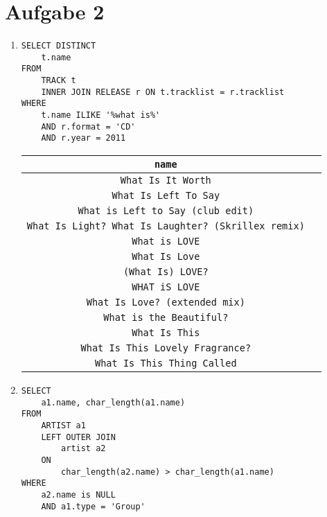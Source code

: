 \documentclass{article}
\begin{document}
    \section*{Aufgabe 2}
    \begin{enumerate}
        \item
            \begin{verbatim}
SELECT DISTINCT
    t.name
FROM
    TRACK t
    INNER JOIN RELEASE r ON t.tracklist = r.tracklist
WHERE
    t.name ILIKE '%what is%'
    AND r.format = 'CD'
    AND r.year = 2011
            \end{verbatim}
            \begin{tabular}{|c|c|}
                \texttt{name} \\
                \toprule
                \texttt{What Is It Worth} \\
                \texttt{What Is Left To Say} \\
                \texttt{What is Left to Say (club edit)} \\
                \texttt{What Is Light? What Is Laughter? (Skrillex remix)} \\
                \texttt{What is LOVE} \\
                \texttt{What Is Love} \\
                \texttt{(What Is) LOVE?} \\
                \texttt{WHAT iS LOVE} \\
                \texttt{What Is Love? (extended mix)} \\
                \texttt{What is the Beautiful?} \\
                \texttt{What Is This} \\
                \texttt{What Is This Lovely Fragrance?} \\
                \texttt{What Is This Thing Called} \\
            \end{tabular}
        \item
            \begin{verbatim}
SELECT
    a1.name, char_length(a1.name)
FROM
    ARTIST a1
    LEFT OUTER JOIN
        artist a2
    ON
        char_length(a2.name) > char_length(a1.name)
WHERE
    a2.name is NULL
    AND a1.type = 'Group'
            \end{verbatim}


\end{enumerate}
\end{document}
